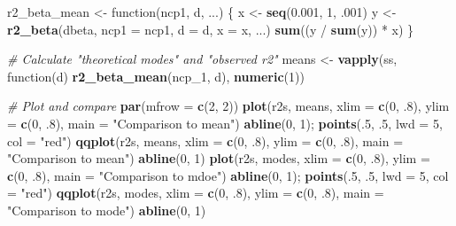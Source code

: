 \documentclass[]{article}
\newenvironment{Shaded}{\begin{snugshade}}{\end{snugshade}}
\newcommand{\KeywordTok}[1]{\textcolor[rgb]{0.13,0.29,0.53}{\textbf{{#1}}}}
\newcommand{\DataTypeTok}[1]{\textcolor[rgb]{0.13,0.29,0.53}{{#1}}}
\newcommand{\DecValTok}[1]{\textcolor[rgb]{0.00,0.00,0.81}{{#1}}}
\newcommand{\FloatTok}[1]{\textcolor[rgb]{0.00,0.00,0.81}{{#1}}}
\newcommand{\StringTok}[1]{\textcolor[rgb]{0.31,0.60,0.02}{{#1}}}
\newcommand{\CommentTok}[1]{\textcolor[rgb]{0.56,0.35,0.01}{\textit{{#1}}}}
\newcommand{\NormalTok}[1]{{#1}}
\begin{document}
\begin{Shaded}
\begin{Highlighting}[]
\NormalTok{r2_beta_mean <-}\StringTok{ }\NormalTok{function(ncp1, d, ...) \{}
  \NormalTok{x <-}\StringTok{ }\KeywordTok{seq}\NormalTok{(}\FloatTok{0.001}\NormalTok{, }\DecValTok{1}\NormalTok{, .}\DecValTok{001}\NormalTok{)}
  \NormalTok{y <-}\StringTok{ }\KeywordTok{r2_beta}\NormalTok{(dbeta, }\DataTypeTok{ncp1 =} \NormalTok{ncp1, }\DataTypeTok{d =} \NormalTok{d, }\DataTypeTok{x =} \NormalTok{x, ...)}
  \KeywordTok{sum}\NormalTok{((y /}\StringTok{ }\KeywordTok{sum}\NormalTok{(y)) *}\StringTok{ }\NormalTok{x)}
\NormalTok{\}}

\CommentTok{# Calculate "theoretical modes" and "observed r2"}
\NormalTok{means <-}\StringTok{ }\KeywordTok{vapply}\NormalTok{(ss, function(d) }\KeywordTok{r2_beta_mean}\NormalTok{(ncp_1, d), }\KeywordTok{numeric}\NormalTok{(}\DecValTok{1}\NormalTok{))}

\CommentTok{# Plot and compare}
\KeywordTok{par}\NormalTok{(}\DataTypeTok{mfrow =} \KeywordTok{c}\NormalTok{(}\DecValTok{2}\NormalTok{, }\DecValTok{2}\NormalTok{))}
\KeywordTok{plot}\NormalTok{(r2s, means, }\DataTypeTok{xlim =} \KeywordTok{c}\NormalTok{(}\DecValTok{0}\NormalTok{, .}\DecValTok{8}\NormalTok{), }\DataTypeTok{ylim =} \KeywordTok{c}\NormalTok{(}\DecValTok{0}\NormalTok{, .}\DecValTok{8}\NormalTok{), }\DataTypeTok{main =} \StringTok{"Comparison to mean"}\NormalTok{)}
  \KeywordTok{abline}\NormalTok{(}\DecValTok{0}\NormalTok{, }\DecValTok{1}\NormalTok{); }\KeywordTok{points}\NormalTok{(.}\DecValTok{5}\NormalTok{, .}\DecValTok{5}\NormalTok{, }\DataTypeTok{lwd =} \DecValTok{5}\NormalTok{, }\DataTypeTok{col =} \StringTok{"red"}\NormalTok{)}
\KeywordTok{qqplot}\NormalTok{(r2s, means, }\DataTypeTok{xlim =} \KeywordTok{c}\NormalTok{(}\DecValTok{0}\NormalTok{, .}\DecValTok{8}\NormalTok{), }\DataTypeTok{ylim =} \KeywordTok{c}\NormalTok{(}\DecValTok{0}\NormalTok{, .}\DecValTok{8}\NormalTok{), }\DataTypeTok{main =} \StringTok{"Comparison to mean"}\NormalTok{)}
  \KeywordTok{abline}\NormalTok{(}\DecValTok{0}\NormalTok{, }\DecValTok{1}\NormalTok{) }
\KeywordTok{plot}\NormalTok{(r2s, modes, }\DataTypeTok{xlim =} \KeywordTok{c}\NormalTok{(}\DecValTok{0}\NormalTok{, .}\DecValTok{8}\NormalTok{), }\DataTypeTok{ylim =} \KeywordTok{c}\NormalTok{(}\DecValTok{0}\NormalTok{, .}\DecValTok{8}\NormalTok{), }\DataTypeTok{main =} \StringTok{"Comparison to mdoe"}\NormalTok{)}
  \KeywordTok{abline}\NormalTok{(}\DecValTok{0}\NormalTok{, }\DecValTok{1}\NormalTok{); }\KeywordTok{points}\NormalTok{(.}\DecValTok{5}\NormalTok{, .}\DecValTok{5}\NormalTok{, }\DataTypeTok{lwd =} \DecValTok{5}\NormalTok{, }\DataTypeTok{col =} \StringTok{"red"}\NormalTok{)}
\KeywordTok{qqplot}\NormalTok{(r2s, modes, }\DataTypeTok{xlim =} \KeywordTok{c}\NormalTok{(}\DecValTok{0}\NormalTok{, .}\DecValTok{8}\NormalTok{), }\DataTypeTok{ylim =} \KeywordTok{c}\NormalTok{(}\DecValTok{0}\NormalTok{, .}\DecValTok{8}\NormalTok{), }\DataTypeTok{main =} \StringTok{"Comparison to mode"}\NormalTok{)}
  \KeywordTok{abline}\NormalTok{(}\DecValTok{0}\NormalTok{, }\DecValTok{1}\NormalTok{) }
\end{Highlighting}
\end{Shaded}
\end{document}
